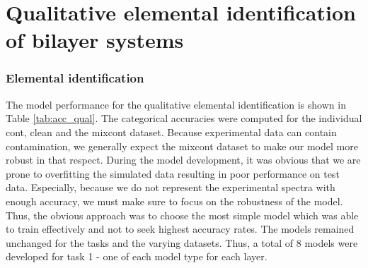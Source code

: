 \section{Qualitative elemental identification of bilayer systems}
\subsubsection{Elemental identification}
The model performance for the qualitative elemental identification is shown in Table \ref{tab:acc_qual}. The categorical accuracies were computed for the individual cont, clean and the mixcont dataset. Because experimental data can contain contamination, we generally expect the mixcont dataset to make our model more robust in that respect.
During the model development, it was obvious that we are prone to overfitting the simulated data resulting in poor performance on test data. Especially, because we do not represent the experimental spectra with enough accuracy, we must make sure to focus on the robustness of the model. Thus, the obvious approach was to choose the most simple model which was able to train effectively and not to seek highest accuracy rates. The models remained unchanged for the tasks and the varying datasets. Thus, a total of 8 models were developed for task 1 - one of each model type for each layer.

